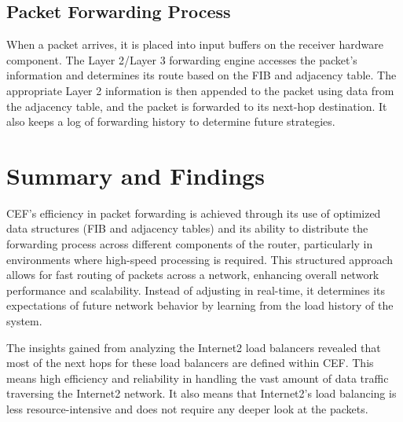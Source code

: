 \documentclass[12pt]{cwru_thesis}
\begin{document}
\subsection{Packet Forwarding Process}

 When a packet arrives, it is placed into input buffers on the receiver hardware component. The Layer 2/Layer 3 forwarding engine accesses the packet's information and determines its route based on the FIB and adjacency table. The appropriate Layer 2 information is then appended to the packet using data from the adjacency table, and the packet is forwarded to its next-hop destination. It also keeps a log of forwarding history to determine future strategies. 




\section{Summary and Findings}


CEF's efficiency in packet forwarding is achieved through its use of optimized data structures (FIB and adjacency tables) and its ability to distribute the forwarding process across different components of the router, particularly in environments where high-speed processing is required. This structured approach allows for fast routing of packets across a network, enhancing overall network performance and scalability. Instead of adjusting in real-time, it determines its expectations of future network behavior by learning from the load history of the system.

The insights gained from analyzing the Internet2 load balancers revealed that most of the next hops for these load balancers are defined within CEF. This means high efficiency and reliability in handling the vast amount of data traffic traversing the Internet2 network. It also means that Internet2's load balancing is less resource-intensive and does not require any deeper look at the packets.
\end{document}
